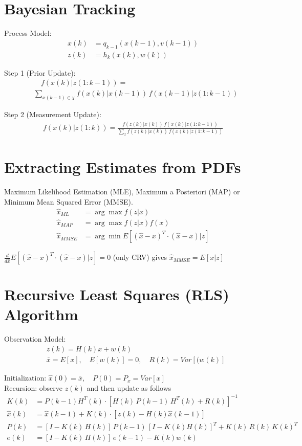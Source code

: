 \documentclass[landscape,a4paper,8pt]{scrartcl}
\begin{document}
\begin{multicols*}{3}
\section{Bayesian Tracking}
Process Model:
\begin{align*}
x(k) &= q_{k-1}( x(k-1), v(k-1)) \nonumber \\
z(k) &= h_k(x(k), w(k)) \label{model1}
\end{align*}

Step 1 (Prior Update):
\begin{align*}
&\quad f(x(k)|z(1:k-1)) = \\
&\sum_{x(k-1) \in \chi} f(x(k)|x(k-1)) \, f(x(k-1)|z(1:k-1))
\end{align*}

Step 2 (Measurement Update):
\begin{align*}
f(x(k)|z(1:k)) = \frac{f(z(k)|x(k)) \, f(x(k)|z(1:k-1))}{\sum_{x} f(z(k)|x(k)) \,  f(x(k) | z(1:k-1))}
\end{align*}

\section{Extracting Estimates from PDFs}
Maximum Likelihood Estimation (MLE), Maximum a Posteriori (MAP) or Minimum Mean Squared Error (MMSE).
\begin{align*}
\hat{x}_{ML} & = \arg\max f(z|x) \\
\hat{x}_{MAP} & = \arg\max f(z|x) f(x) \\
\hat{x}_{MMSE} & = \arg\min E[(\hat{x} - x)^T \cdot (\hat{x} - x) | z]
\end{align*}

$\frac{d}{d \hat{x}} E[(\hat{x} - x)^T \cdot (\hat{x} - x) | z] = 0$ (only CRV) gives $\hat{x}_{MMSE} = E[x|z]$

\section{Recursive Least Squares (RLS) Algorithm}
Observation Model:
\begin{align*}
&z(k) = H(k) x + w(k) \\
&\bar{x} = E[x], \quad E[w(k)] = 0, \quad  R(k) = Var[(w(k)]
\end{align*}

Initialization: $\hat{x}(0) = \bar{x}, \quad P(0) = P_x = Var[x]$ \\

Recursion: observe $z(k)$ and then update as follows 
\begin{align*}
K(k) &= P(k-1) H^T (k) \cdot [H(k) \, P(k-1)\, H^T (k) + R(k)]^{-1} \\
\hat{x}(k) &= \hat{x}(k-1) + K(k) \cdot [z(k) - H(k) \hat{x}(k-1)] \\
P(k) &= [I-K(k) \, H(k)] \,  P(k-1) \, [I-K(k) H(k)] ^T +  K(k) \,  R(k) \,  K(k)^T \\
e(k) &= [I-K(k)\, H(k)] \, e(k-1) - K(k) w(k)
\end{align*}



\end{multicols*}
\end{document}
